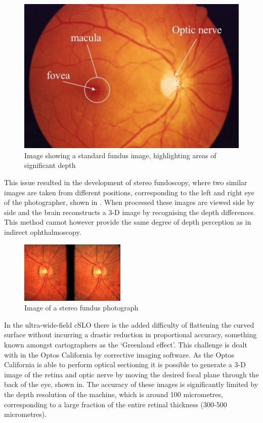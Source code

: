 \begin{figure}[htbp]
\centering
 \includegraphics{figures/normalfundus}
\caption{Image showing a  standard fundus image, highlighting areas of significant depth}
\label{fig:standard}
    \end{figure}

This issue resulted in the development of stereo fundoscopy, where
two similar images are taken from different positions, corresponding
to the left and right eye of the photographer, shown in .
When processed these images are viewed side by side and the brain
reconstructs a 3-D image by recognising the depth differences.\cite{tyler1997stereo}
This method cannot however provide the same degree of depth perception
as in indirect ophthalmoscopy.

\begin{figure}[htbp]
\centering
 \includegraphics{figures/stereo}
\caption{Image of a stereo fundus photograph}
\label{fig:stereo}
    \end{figure}

In the ultra-wide-field cSLO there is the added difficulty of flattening
the curved surface without incurring a drastic reduction in proportional
accuracy, something known amongst cartographers as the ‘Greenland effect’.
This challenge is dealt with in the Optos California by corrective imaging
software. As the Optos California is able to perform optical sectioning it
is possible to generate a 3-D image of the retina and optic nerve by moving
the desired focal plane through the back of the eye, shown in.
The accuracy of these images is significantly limited by the depth resolution
of the machine, which is around 100 micrometres, corresponding to  a large
fraction of the entire retinal thickness (300-500 micrometres).

